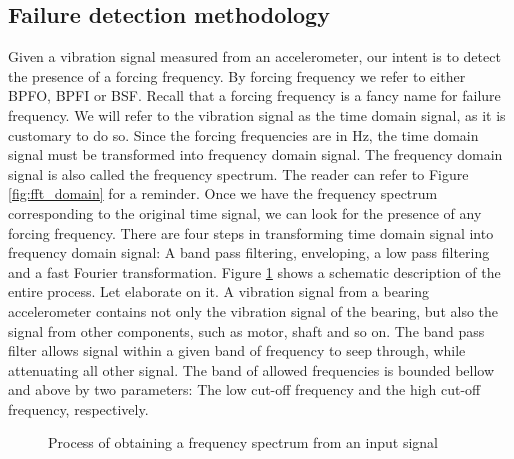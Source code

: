 \documentclass[../Main/thesis.tex]{subfiles}
\begin{document}
\subsection{Failure detection methodology}
Given a vibration signal measured from an accelerometer, our intent is to detect the presence of a forcing frequency. By forcing frequency we refer to either BPFO, BPFI or BSF. Recall that a forcing frequency is a fancy name for failure frequency. We will refer to the vibration signal as the time domain signal, as it is customary to do so. Since the forcing frequencies are in Hz, the time domain signal must be transformed into frequency domain signal. The frequency domain signal is also called the frequency spectrum. The reader can refer to Figure \ref{fig:fft_domain} for a reminder. Once we have the frequency spectrum corresponding to the original time signal, we can look for the presence of any forcing frequency.
\justify
There are four steps in transforming time domain signal into frequency domain signal: A band pass filtering, enveloping, a low pass filtering and a fast Fourier transformation.
Figure \ref{fig:fft-process} shows a schematic description of the entire process. Let elaborate on it.  A vibration signal from a bearing accelerometer contains not only the vibration signal of the bearing, but also the signal from other components, such as motor, shaft and so on.
\justify
The band pass filter allows signal within a given band of frequency to seep through, while attenuating all other signal. The band of allowed frequencies is bounded bellow and above by two parameters: The low cut-off frequency and the high cut-off frequency, respectively.
\begin{figure}[H]
  \caption{Process of obtaining a frequency spectrum from an input signal}
   \label{fig:fft-process}
\end{figure}
\end{document}
